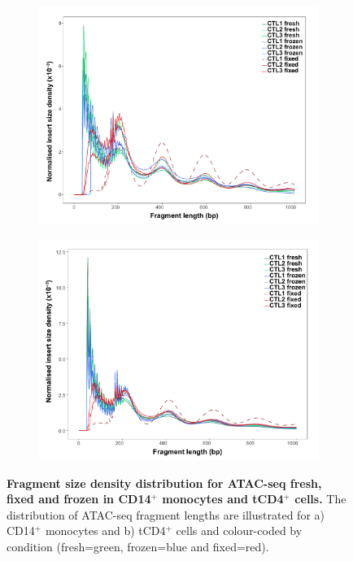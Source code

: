 \begin{figure}[htbp]
\centering
\begin{subfigure}{0.5\textwidth}
\centering
\includegraphics[width=\textwidth]{./Results1/pdfs/Core_ATAC_CD14_fresh_frozen_fixed_frag_size_distribution}
\caption{\textbf{}}
\end{subfigure}%
\begin{subfigure}{0.5\textwidth}
\centering
\includegraphics[width=\textwidth]{./Results1/pdfs/Core_ATAC_CD4_fresh_frozen_fixed_frag_size_distribution}
\caption{\textbf{}}
\end{subfigure}
\caption[Fragment size density distribution for ATAC-seq fresh, fixed and frozen in CD14$^+$ monocytes and tCD4$^+$ cells.]{\textbf{Fragment size density distribution for ATAC-seq fresh, fixed and frozen in CD14$^+$ monocytes and tCD4$^+$ cells.} The distribution of ATAC-seq fragment lengths are illustrated for a) CD14$^+$ monocytes and b) tCD4$^+$ cells and colour-coded by condition (fresh=green, frozen=blue and fixed=red).}
\label{figure:Core_ATAC_all_fragment_size_distribution}
\end{figure} 



